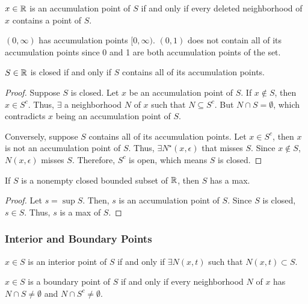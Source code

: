 \begin{definition}
    $x \in \mathbb{R}$ is an accumulation point of $S$ if and only if every deleted neighborhood of $x$ contains a point of $S$.
\end{definition}
\begin{remark}
    $(0, \infty)$ has accumulation points $[0, \infty)$. $(0, 1)$ does not contain all of its accumulation points since 0 and 1 are both accumulation points of the set.
\end{remark}

\begin{theorem}
    $S \in \mathbb{R}$ is closed if and only if $S$ contains all of its accumulation points.
\end{theorem}
\begin{proof}
    Suppose $S$ is closed. Let $x$ be an accumulation point of $S$. If $x \not\in S$, then $x \in S^c$. Thus, $\exists$ a neighborhood $N$ of $x$ such that $N \subseteq S^c$. But $N \cap S = \emptyset$, which contradicts $x$ being an accumulation point of $S$.

    Conversely, suppose $S$ contains all of its accumulation points. Let $x \in S^c$, then $x$ is not an accumulation point of $S$. Thus, $\exists N^\star(x, \epsilon)$ that misses $S$. Since $x \not\in S$, $N(x, \epsilon)$ misses $S$. Therefore, $S^c$ is open, which means $S$ is closed.
\end{proof}

\begin{theorem}
    If $S$ is a nonempty closed bounded subset of $\mathbb{R}$, then $S$ has a max.
\end{theorem}
\begin{proof}
    Let $s = \sup S$. Then, $s$ is an accumulation point of $S$. Since $S$ is closed, $s \in S$. Thus, $s$ is a max of $S$.
\end{proof}

\subsubsection{Interior and Boundary Points}
\begin{definition}
    $x \in S$ is an interior point of $S$ if and only if $\exists N(x, t)$ such that $N(x, t) \subset S$.
\end{definition}

\begin{definition}
    $x \in S$ is a boundary point of $S$ if and only if every neighborhood $N$ of $x$ has $N \cap S \neq \emptyset$ and $N \cap S^c \neq \emptyset$.
\end{definition}

